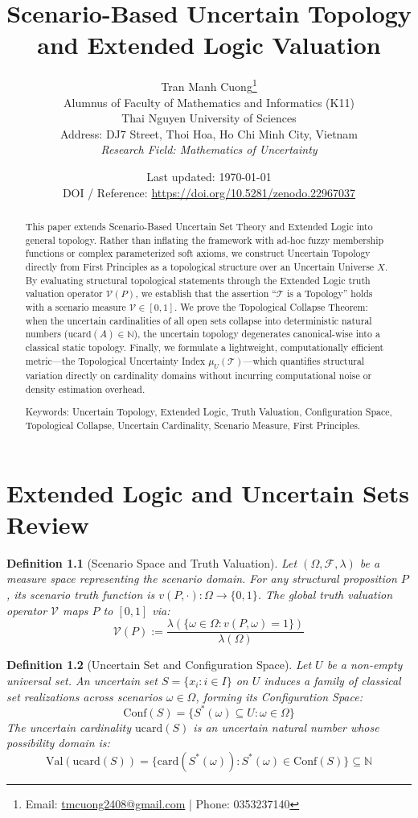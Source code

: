 \documentclass[a4paper,14pt, twoside]{memoir}
\title{Scenario-Based Uncertain Topology and Extended Logic Valuation}
\author{
	Tran Manh Cuong\thanks{Email: \href{mailto:tmcuong2408@gmail.com}{tmcuong2408@gmail.com} | Phone: 0353237140} \\[0.5em]
	\small Alumnus of Faculty of Mathematics and Informatics (K11)
	\\ Thai Nguyen University of Sciences \\
	\small Address: DJ7 Street, Thoi Hoa, Ho Chi Minh City, Vietnam \\
	\small \textit{Research Field: Mathematics of Uncertainty}
}
\date{Last updated: \today \\ \small DOI / Reference: \url{https://doi.org/10.5281/zenodo.22967037} \cite{uset}}
\newtheorem{definition}{Definition}[chapter]
\begin{document}
	
	\maketitle
	
	\begin{abstract}
		This paper extends Scenario-Based Uncertain Set Theory and Extended Logic into general topology. Rather than inflating the framework with ad-hoc fuzzy membership functions or complex parameterized soft axioms, we construct Uncertain Topology directly from First Principles as a topological structure over an Uncertain Universe $X$. By evaluating structural topological statements through the Extended Logic truth valuation operator $\mathcal{V}(P)$, we establish that the assertion ``$\mathcal{T}$ is a Topology'' holds with a scenario measure $\mathcal{V} \in [0, 1]$. We prove the Topological Collapse Theorem: when the uncertain cardinalities of all open sets collapse into deterministic natural numbers ($\mathrm{ucard}(A) \in \mathbb{N}$), the uncertain topology degenerates canonical-wise into a classical static topology. Finally, we formulate a lightweight, computationally efficient metric—the Topological Uncertainty Index $\mu_U(\mathcal{T})$—which quantifies structural variation directly on cardinality domains without incurring computational noise or density estimation overhead.
		
		\vspace{1em}
		\noindent Keywords: Uncertain Topology, Extended Logic, Truth Valuation, Configuration Space, Topological Collapse, Uncertain Cardinality, Scenario Measure, First Principles.
	\end{abstract}
	
	\chapter{Extended Logic and Uncertain Sets Review}
	
	\begin{definition}[Scenario Space and Truth Valuation]
		Let $(\Omega, \mathcal{F}, \lambda)$ be a measure space representing the scenario domain. For any structural proposition $P$, its scenario truth function is $v(P, \cdot): \Omega \to \{0, 1\}$. The global truth valuation operator $\mathcal{V}$ maps $P$ to $[0, 1]$ via:
		\[
		\mathcal{V}(P) := \frac{\lambda(\{\omega \in \Omega : v(P, \omega) = 1\})}{\lambda(\Omega)}
		\]
	\end{definition}
	
	\begin{definition}[Uncertain Set and Configuration Space]
		Let $U$ be a non-empty universal set. An uncertain set $S = \{x_i : i \in I\}$ on $U$ induces a family of classical set realizations across scenarios $\omega \in \Omega$, forming its Configuration Space:
		\[
		\mathrm{Conf}(S) = \{ S^*(\omega) \subseteq U : \omega \in \Omega \}
		\]
		The uncertain cardinality $\mathrm{ucard}(S)$ is an uncertain natural number whose possibility domain is:
		\[
		\mathrm{Val}(\mathrm{ucard}(S)) = \{ \mathrm{card}(S^*(\omega)) : S^*(\omega) \in \mathrm{Conf}(S) \} \subseteq \mathbb{N}
		\]
	\end{definition}
	
\end{document}
